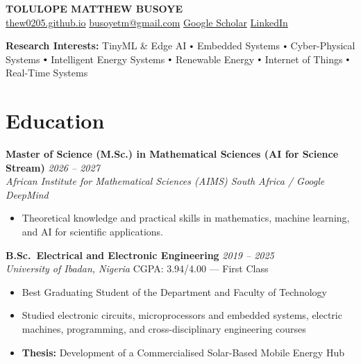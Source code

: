 \documentclass[10pt, a4paper]{article}
\newcommand{\cventry}[4]{%
  \noindent\textbf{#1} \hfill \textit{#2}\\%
  \textit{#3} \hfill \small{#4}\\[-4pt]%
}
\newcommand*{\thickdot}{\mathbin{\vcenter{\hbox{\scalebox{0.7}{$\bullet$}}}}}
\begin{document}
\begin{center}
  {\LARGE\bfseries\color{accent} TOLULOPE MATTHEW BUSOYE}\\[4pt]
  \href{https://thew0205.github.io}{thew0205.github.io} \quad
  \href{mailto:busoyetm@gmail.com}{busoyetm@gmail.com} \quad
  \href{https://scholar.google.com/citations?user=iPShkhUAAAAJ&hl=en}{Google Scholar} \quad
  \href{https://www.linkedin.com/in/tolulopematthewbusoye}{LinkedIn}
\end{center}

\noindent\textbf{Research Interests:} TinyML \& Edge AI $\thickdot$ Embedded
Systems $\thickdot$ Cyber-Physical Systems $\thickdot$ Intelligent Energy Systems $\thickdot$ Renewable Energy $\thickdot$ Internet of Things $\thickdot$ Real-Time Systems

\section{Education}

\cventry{Master of Science (M.Sc.) in Mathematical Sciences (AI for Science Stream)}{2026 -- 2027}{African Institute for Mathematical Sciences (AIMS) South Africa / Google DeepMind}{}
\begin{itemize}
  \item Theoretical knowledge and practical skills in mathematics, machine learning, and AI for scientific applications.
\end{itemize}

\vspace{4pt}

\cventry{B.Sc.\ Electrical and Electronic Engineering}{2019 -- 2025}{University of Ibadan, Nigeria}{CGPA: 3.94/4.00 --- First Class}
\begin{itemize}
  \item Best Graduating Student of the Department and Faculty of Technology
  \item Studied electronic circuits, microprocessors and embedded systems, electric machines, programming, and cross-disciplinary engineering courses
  \item \textbf{Thesis:} Development of a Commercialised Solar-Based Mobile Energy Hub
\end{itemize}
\end{document}
